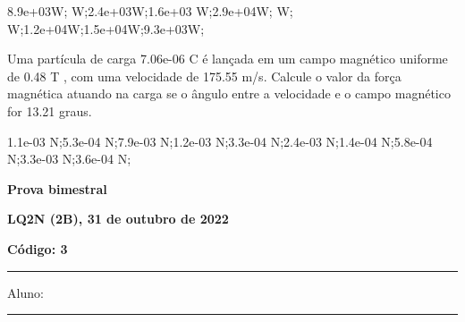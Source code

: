 \documentclass[12pt, addpoints]{exam}
\begin{document}
\begin{questions}
\begin{multicols*}{2}
\begin{oneparchoices}
\choice 8.9e+03W; W;\choice 2.4e+03W;\choice 1.6e+03 W;\choice 2.9e+04W; W; W;\choice 1.2e+04W;\choice 1.5e+04W;\choice 9.3e+03W;\end{oneparchoices}
\question[20] Uma partícula de carga 7.06e-06 C é lançada em um campo magnético uniforme de    0.48 T , com uma velocidade de 175.55 m/s. Calcule o valor da força magnética atuando na carga se o ângulo entre a velocidade e o campo magnético for   13.21 graus.

\begin{oneparchoices}
\choice 1.1e-03 N;\choice 5.3e-04 N;\choice 7.9e-03 N;\choice 1.2e-03 N;\choice 3.3e-04 N;\choice 2.4e-03 N;\choice 1.4e-04 N;\choice 5.8e-04 N;\choice 3.3e-03 N;\choice 3.6e-04 N;\end{oneparchoices}
\end{multicols*}
\end{questions}
\newpage
        \begin{minipage}[b]{0.75\linewidth}
            \begin{flushleft}
                {\bf \large Prova bimestral}
            \end{flushleft}
            \begin{flushleft}
                {\bf \large LQ2N (2B), 31 de outubro de 2022}
            \end{flushleft}
        \end{minipage}
        \begin{minipage}[b]{0.20\linewidth}
            \begin{flushright}
                {\bf \large Código: 3}
            \end{flushright}
        \end{minipage}
        \vspace{0.5cm} \hrule \vspace{0.5cm}
        \begin{minipage}{0.75\linewidth}
            Aluno:
        \end{minipage}
        \vspace{0.5cm} \hrule \vspace{0.5cm}
\end{document}

